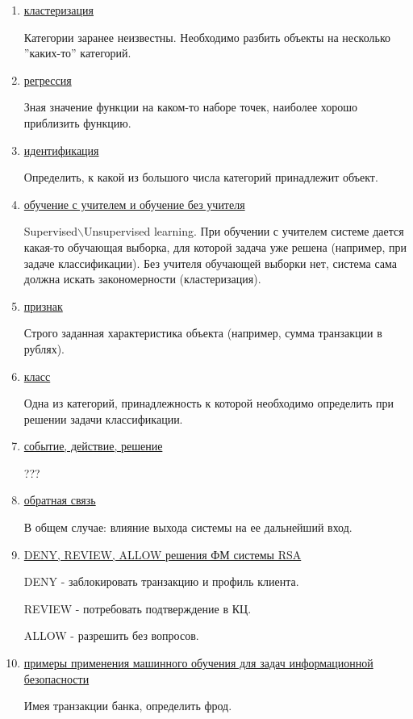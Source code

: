 \documentclass{proc}
\begin{document}
\begin{enumerate}
\item \underline{кластеризация}

Категории заранее неизвестны. Необходимо разбить объекты на несколько ''каких-то'' категорий.

\item \underline{регрессия}

Зная значение функции на каком-то наборе точек, наиболее хорошо приблизить функцию.

\item \underline{идентификация}

Определить, к какой из большого числа категорий принадлежит объект.

\item \underline{обучение с учителем и обучение без учителя}

Supervised$\backslash$Unsupervised learning. При обучении с учителем системе дается какая-то обучающая выборка, для которой задача уже решена (например, при задаче классификации). Без учителя обучающей выборки нет, система сама должна искать закономерности (кластеризация).

\item \underline{признак}

Строго заданная характеристика объекта (например, сумма транзакции в рублях).

\item \underline{класс}

Одна из категорий, принадлежность к которой необходимо определить при решении задачи классификации.

\item \underline{событие, действие, решение}

???

\item \underline{обратная связь}

В общем случае: влияние выхода системы на ее дальнейший вход.

\item \underline{DENY, REVIEW, ALLOW решения ФМ системы RSA}

DENY - заблокировать транзакцию и профиль клиента.

REVIEW - потребовать подтверждение в КЦ.

ALLOW - разрешить без вопросов.

\item \underline{примеры применения машинного обучения для задач информационной безопасности}

Имея транзакции банка, определить фрод.


\end{enumerate}
\end{document}
